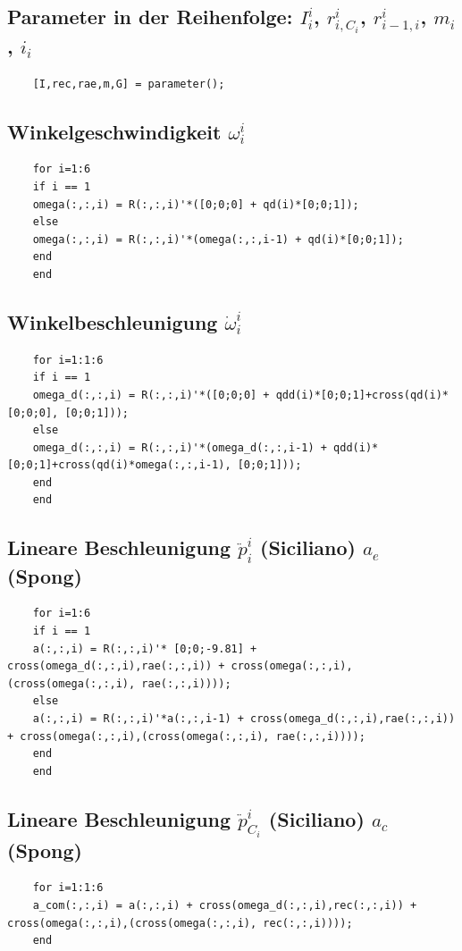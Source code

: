 \subsection*{Parameter in der Reihenfolge: $I^{i}_{i}$, $r^{i}_{i,C_i}$, $r^{i}_{i-1,i}$, $m_i$, $i_i$}
%
\begin{lstlisting}
	[I,rec,rae,m,G] = parameter();
\end{lstlisting}
%
\subsection*{Winkelgeschwindigkeit $\omega^{i}_i$}
%
\begin{lstlisting}
	for i=1:6
	if i == 1
	omega(:,:,i) = R(:,:,i)'*([0;0;0] + qd(i)*[0;0;1]);
	else
	omega(:,:,i) = R(:,:,i)'*(omega(:,:,i-1) + qd(i)*[0;0;1]);
	end
	end
\end{lstlisting}
%
\subsection*{Winkelbeschleunigung $\dot\omega^{i}_i$}
%
\begin{lstlisting}
	for i=1:1:6
	if i == 1
	omega_d(:,:,i) = R(:,:,i)'*([0;0;0] + qdd(i)*[0;0;1]+cross(qd(i)*[0;0;0], [0;0;1]));
	else
	omega_d(:,:,i) = R(:,:,i)'*(omega_d(:,:,i-1) + qdd(i)*[0;0;1]+cross(qd(i)*omega(:,:,i-1), [0;0;1]));
	end
	end
\end{lstlisting}
%
\subsection*{Lineare Beschleunigung $\ddot p^{i}_i$ (Siciliano) $a_e$ (Spong)}
%
\begin{lstlisting}
	for i=1:6
	if i == 1
	a(:,:,i) = R(:,:,i)'* [0;0;-9.81] + cross(omega_d(:,:,i),rae(:,:,i)) + cross(omega(:,:,i),(cross(omega(:,:,i), rae(:,:,i))));
	else
	a(:,:,i) = R(:,:,i)'*a(:,:,i-1) + cross(omega_d(:,:,i),rae(:,:,i)) + cross(omega(:,:,i),(cross(omega(:,:,i), rae(:,:,i))));
	end
	end
\end{lstlisting}
%
\subsection*{Lineare Beschleunigung $\ddot p^{i}_{C_i}$ (Siciliano) $a_c$ (Spong)}
%
\begin{lstlisting}
	for i=1:1:6
	a_com(:,:,i) = a(:,:,i) + cross(omega_d(:,:,i),rec(:,:,i)) + cross(omega(:,:,i),(cross(omega(:,:,i), rec(:,:,i))));
	end
\end{lstlisting}
%
